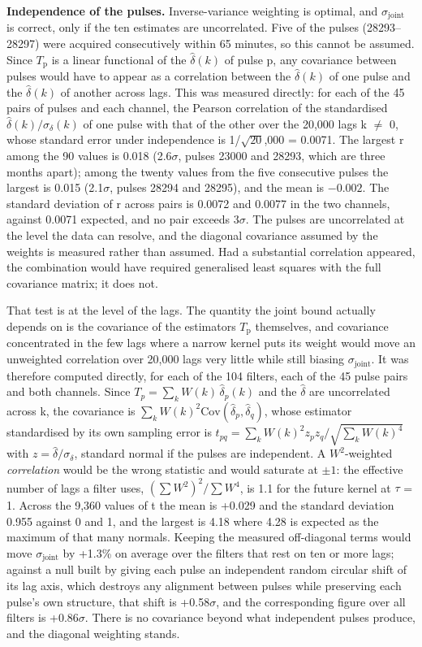 \documentclass[
  11pt,
]{article}
\begin{document}
\textbf{Independence of the pulses.} Inverse-variance weighting is
optimal, and \(\sigma_{\mathrm{joint}}\) is correct, only if the ten
estimates are uncorrelated. Five of the pulses (28293--28297) were
acquired consecutively within 65 minutes, so this cannot be assumed.
Since \(T_{\mathrm{p}}\) is a linear functional of the \(\hat\delta(k)\)
of pulse p, any covariance between pulses would have to appear as a
correlation between the \(\hat\delta(k)\) of one pulse and the
\(\hat\delta(k)\) of another across lags. This was measured directly:
for each of the 45 pairs of pulses and each channel, the Pearson
correlation of the standardised \(\hat\delta(k)/\sigma_\delta(k)\) of
one pulse with that of the other over the 20,000 lags k \(\ne\) 0, whose
standard error under independence is 1/\(\sqrt{20}\),000 = 0.0071. The
largest \textbar r\textbar{} among the 90 values is 0.018
(2.6\(\sigma\), pulses 23000 and 28293, which are three months apart);
among the twenty values from the five consecutive pulses the largest is
0.015 (2.1\(\sigma\), pulses 28294 and 28295), and the mean is
\(-0.002.\) The standard deviation of r across pairs is 0.0072 and
0.0077 in the two channels, against 0.0071 expected, and no pair exceeds
3\(\sigma\). The pulses are uncorrelated at the level the data can
resolve, and the diagonal covariance assumed by the weights is measured
rather than assumed. Had a substantial correlation appeared, the
combination would have required generalised least squares with the full
covariance matrix; it does not.

That test is at the level of the lags. The quantity the joint bound
actually depends on is the covariance of the estimators
\(T_{\mathrm{p}}\) themselves, and covariance concentrated in the few
lags where a narrow kernel puts its weight would move an unweighted
correlation over 20,000 lags very little while still biasing
\(\sigma_{\mathrm{joint}}\). It was therefore computed directly, for
each of the 104 filters, each of the 45 pulse pairs and both channels.
Since \(T_p = \sum_k W(k)\,\hat\delta_p(k)\) and the \(\hat\delta\) are
uncorrelated across k, the covariance is
\(\sum_k W(k)^2 \mathrm{Cov}(\hat\delta_p, \hat\delta_q)\), whose
estimator standardised by its own sampling error is
\(t_{pq} = \sum_k W(k)^2 z_p z_q / \sqrt{\sum_k W(k)^4}\) with
\(z = \hat\delta/\sigma_\delta\), standard normal if the pulses are
independent. A \(W^{2}\)-weighted \emph{correlation} would be the wrong
statistic and would saturate at \(\pm 1\): the effective number of lags
a filter uses, \((\sum W^2)^2/\sum W^4\), is 1.1 for the future kernel
at \(\tau\) = 1. Across the 9,360 values of t the mean is +0.029 and the
standard deviation 0.955 against 0 and 1, and the largest is 4.18 where
4.28 is expected as the maximum of that many normals. Keeping the
measured off-diagonal terms would move \(\sigma_{\mathrm{joint}}\) by
+1.3\% on average over the filters that rest on ten or more lags;
against a null built by giving each pulse an independent random circular
shift of its lag axis, which destroys any alignment between pulses while
preserving each pulse's own structure, that shift is +0.58\(\sigma\),
and the corresponding figure over all filters is +0.86\(\sigma\). There
is no covariance beyond what independent pulses produce, and the
diagonal weighting stands.
\end{document}
